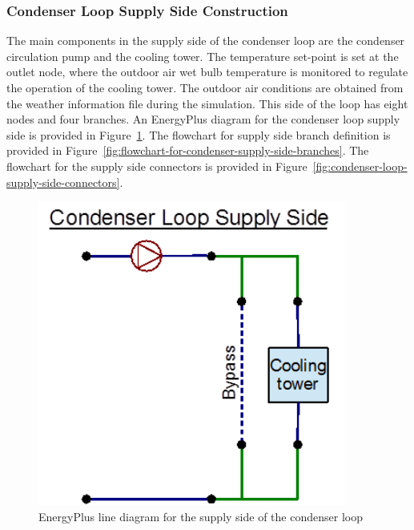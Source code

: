\subsubsection{Condenser Loop Supply Side Construction}\label{condenser-loop-supply-side-construction-001}

The main components in the supply side of the condenser loop are the condenser circulation pump and the cooling tower. The temperature set-point is set at the outlet node, where the outdoor air wet bulb temperature is monitored to regulate the operation of the cooling tower. The outdoor air conditions are obtained from the weather information file during the simulation. This side of the loop has eight nodes and four branches. An EnergyPlus diagram for the condenser loop supply side is provided in Figure~\ref{fig:energyplus-line-diagram-for-the-supply-side-003}. The flowchart for supply side branch definition is provided in Figure~\ref{fig:flowchart-for-condenser-supply-side-branches}. The flowchart for the supply side connectors is provided in Figure~\ref{fig:condenser-loop-supply-side-connectors}.

\begin{figure}[hbtp] %
\centering
\includegraphics[width=0.9\textwidth, height=0.9\textheight, keepaspectratio=true]{media/image031.png}
\caption{EnergyPlus line diagram for the supply side of the condenser loop \protect \label{fig:energyplus-line-diagram-for-the-supply-side-003}}
\end{figure}

